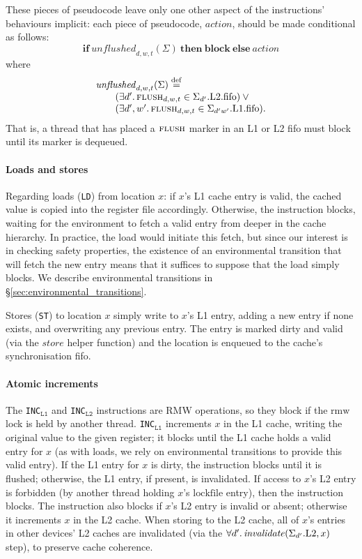 \documentclass[svgnames,10pt]{sigplanconf}
\makeatletter
\theoremstyle{definition}
\newcommand\stack[2][l]{{\renewcommand\arraystretch{1}\begin{array}[t]{@{}#1@{}}#2\end{array}}}
\newcommand\var[1]{\mathit{#1}}
\newcommand\eqdef{\overset{{\tiny\rm def}}{=}}
\newcommand\IF{\textbf{if}}
\newcommand\THEN{\textbf{then}}
\newcommand\ELSE{\textbf{else}}
\newcommand\BLOCK{\textbf{block}}
\newcommand\INSld{\texttt{LD}}
\newcommand\INSst{\texttt{ST}}
\newcommand\INSincl[1]{\texttt{INC$_{\texttt{L#1}}$}}
\makeatother
\begin{document}
These pieces of pseudocode leave only one other aspect of the
instructions' behaviours implicit: each piece of pseudocode, $\var{action}$, should be made conditional as follows:
\[
\IF~\var{unflushed}_{d, w, t}(\Sigma)~\THEN~\BLOCK~\ELSE~\var{action}
\]
where
\[
\stack{\var{unflushed}_{d, w, t}(\Sigma) \eqdef {}\\\qquad (\exists
d'\ldotp\textsc{flush}_{d,w,t}
\in\Sigma_{d'}.\mathrm{L2}.\mathrm{fifo}) \vee {}\\\qquad (\exists d',w'\ldotp \textsc{flush}_{d,w,t}
\in\Sigma_{d'w'}.\mathrm{L1}.\mathrm{fifo}).}
\]
That is, a thread that has placed a $\textsc{flush}$ marker in an L1 or L2 fifo must block until its marker is dequeued.

\paragraph{Loads and stores} 
Regarding loads (\INSld) from location $x$: if $x$'s L1 cache entry is
valid, the cached value is copied into the register file accordingly.
Otherwise, the instruction blocks, waiting for the environment to
fetch a valid entry from deeper in the cache hierarchy. In practice,
the load would initiate this fetch, but since our interest is in
checking safety properties, the existence of an environmental
transition that will fetch the new entry means that it suffices to
suppose that the load simply blocks.  We describe environmental transitions in \S\ref{sec:environmental_transitions}.

Stores (\INSst) to location $x$ simply write to $x$'s L1 entry, adding
a new entry if none exists, and overwriting any previous entry. The
entry is marked dirty and valid (via the $\var{store}$ helper
function) and the location is enqueued to the cache's synchronisation
fifo.

\paragraph{Atomic increments}
The \INSincl1 and \INSincl2 instructions are RMW operations, so they
block if the $\mathrm{rmw}$ lock is held by another thread. \INSincl1
increments $x$ in the L1 cache, writing the original value to the
given register; it blocks until the L1 cache holds a valid entry for
$x$ (as with loads, we rely on environmental transitions to provide
this valid entry). If the L1 entry for $x$ is dirty, the instruction
blocks until it is flushed; otherwise, the L1 entry, if present, is
invalidated. If access to $x$'s L2 entry is forbidden (by another
thread holding $x$'s $\mathrm{lockfile}$ entry), then the instruction
blocks. The instruction also blocks if $x$'s L2 entry is invalid or
absent; otherwise it increments $x$ in the L2 cache. When storing to
the L2 cache, all of $x$'s entries in other devices' L2 caches are
invalidated (via the
$\forall d'\ldotp \var{invalidate}(\Sigma_{d'}.\mathrm{L2},x)$ step), to
preserve cache coherence.
\end{document}
